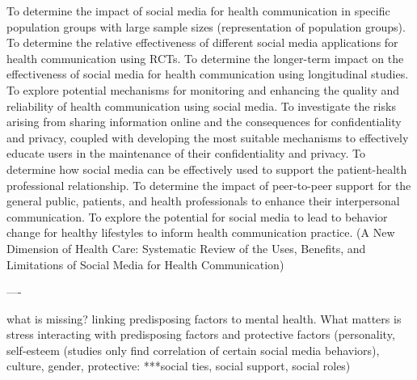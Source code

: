 To determine the impact of social media for health communication in specific population groups with large sample sizes (representation of population groups).
To determine the relative effectiveness of different social media applications for health communication using RCTs.
To determine the longer-term impact on the effectiveness of social media for health communication using longitudinal studies.
To explore potential mechanisms for monitoring and enhancing the quality and reliability of health communication using social media.
To investigate the risks arising from sharing information online and the consequences for confidentiality and privacy, coupled with developing the most suitable mechanisms to effectively educate users in the maintenance of their confidentiality and privacy.
To determine how social media can be effectively used to support the patient-health professional relationship.
To determine the impact of peer-to-peer support for the general public, patients, and health professionals to enhance their interpersonal communication.
To explore the potential for social media to lead to behavior change for healthy lifestyles to inform health communication practice.
(A New Dimension of Health Care: Systematic Review of the Uses, Benefits, and Limitations of Social Media for Health Communication)

----

what is missing? linking predisposing factors to mental health. What matters is stress interacting with predisposing factors and protective factors 
(personality, self-esteem (studies only find correlation of certain social media behaviors), culture, gender, protective: ***social ties, social support, social roles)




